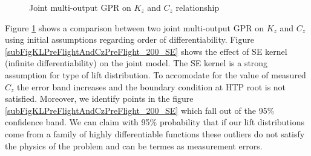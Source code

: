 \begin{figure}[!ht]
  \centering
  \quad
  
  \caption{Joint multi-output GPR on  \(K_{z}\) and \(C_{z}\) relationship}\label{fig:cztzRelationship}
\end{figure}


Figure \ref{fig:cztzRelationship} shows a comparison between two joint multi-output GPR on \(K_{z}\) and \(C_{z}\) using initial assumptions regarding order of differentiability. Figure \ref{subFigKLPreFlightAndCzPreFlight_200_SE} shows the effect of SE kernel (infinite differentiability) on the joint model. The SE kernel is a strong assumption for type of lift distribution. To accomodate for the value of measured \(C_{z}\) the error band increases and the boundary condition at HTP root is not satisfied. Moreover, we identify points in the figure \ref{subFigKLPreFlightAndCzPreFlight_200_SE} which fall out of the 95\% confidence band. We can claim with 95\% probability that if our lift distributions come from a family of highly differentiable functions these outliers do not satisfy the physics of the problem and can be termes as measurement errors.


